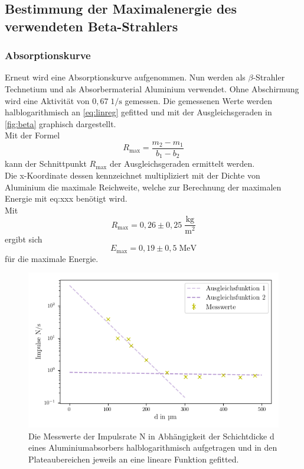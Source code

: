 \subsection{Bestimmung der Maximalenergie des verwendeten Beta-Strahlers}
\subsubsection*{Absorptionskurve}
Erneut wird eine Absorptionskurve aufgenommen. Nun werden als $\beta$-Strahler Technetium
und als Absorbermaterial Aluminium verwendet. 
Ohne Abschirmung wird eine Aktivität von $0,67 \; \mathrm{1/s}$ gemessen.
Die gemessenen Werte werden halblogarithmisch an \autoref{eq:linreg} gefitted und mit der Ausgleichsgeraden
in \autoref{fig:beta} graphisch dargestellt.\\
Mit der Formel
\begin{equation*}
  R_{\max} = \frac{m_2 - m_1}{b_1 - b_2}
\end{equation*}
kann der Schnittpunkt $R_{\max}$ der Ausgleichsgeraden ermittelt werden.\\
Die x-Koordinate dessen kennzeichnet multipliziert mit der Dichte von Aluminium \cite{aludichte} die maximale Reichweite, welche 
zur Berechnung der maximalen Energie mit eq:xxx benötigt wird. \\
Mit 
\begin{equation*}
  R_{\max} = 0,26 \pm 0,25 \; \mathrm{\frac{kg}{m^2}}   %
\end{equation*}
ergibt sich 
\begin{equation*}
  E_{\max} = 0,19 \pm 0,5 \; \mathrm{MeV}    %
\end{equation*}
für die maximale Energie.

\begin{figure}[H]
  \centering
  \includegraphics{content/zeitdruck.png}
  \caption{Die Messwerte der Impulsrate N in Abhängigkeit der 
  Schichtdicke d eines Aluminiumabsorbers halblogarithmisch aufgetragen und in den Plateaubereichen jeweils an eine lineare Funktion gefitted.}
  \label{fig:beta}
\end{figure}
